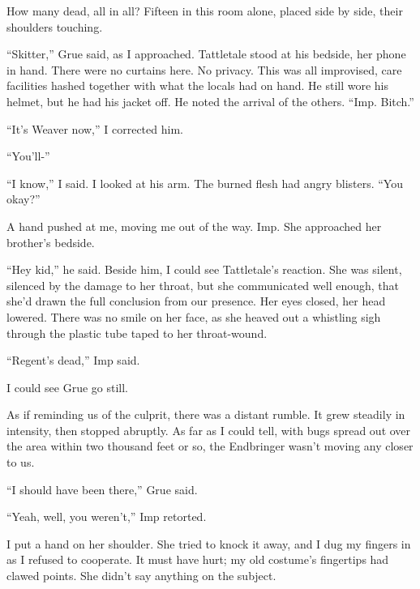 How many dead, all in all?  Fifteen in this room alone, placed side by side, their shoulders touching.



``Skitter,'' Grue said, as I approached. Tattletale stood at his bedside, her phone in hand.  There were no curtains here.  No privacy.  This was all improvised, care facilities hashed together with what the locals had on hand.  He still wore his helmet, but he had his jacket off.  He noted the arrival of the others.  ``Imp.  Bitch.''



``It's Weaver now,'' I corrected him.



``You'll-''



``I know,'' I said.  I looked at his arm.  The burned flesh had angry blisters.  ``You okay?''



A hand pushed at me, moving me out of the way.  Imp.  She approached her brother's bedside.



``Hey kid,'' he said.  Beside him, I could see Tattletale's reaction.  She was silent, silenced by the damage to her throat, but she communicated well enough, that she'd drawn the full conclusion from our presence.  Her eyes closed, her head lowered.  There was no smile on her face, as she heaved out a whistling sigh through the plastic tube taped to her throat-wound.



``Regent's dead,'' Imp said.



I could see Grue go still.



As if reminding us of the culprit, there was a distant rumble.  It grew steadily in intensity, then stopped abruptly.  As far as I could tell, with bugs spread out over the area within two thousand feet or so, the Endbringer wasn't moving any closer to us.



``I should have been there,'' Grue said.



``Yeah, well, you weren't,'' Imp retorted.



I put a hand on her shoulder.  She tried to knock it away, and I dug my fingers in as I refused to cooperate.  It must have hurt; my old costume's fingertips had clawed points.  She didn't say anything on the subject.



